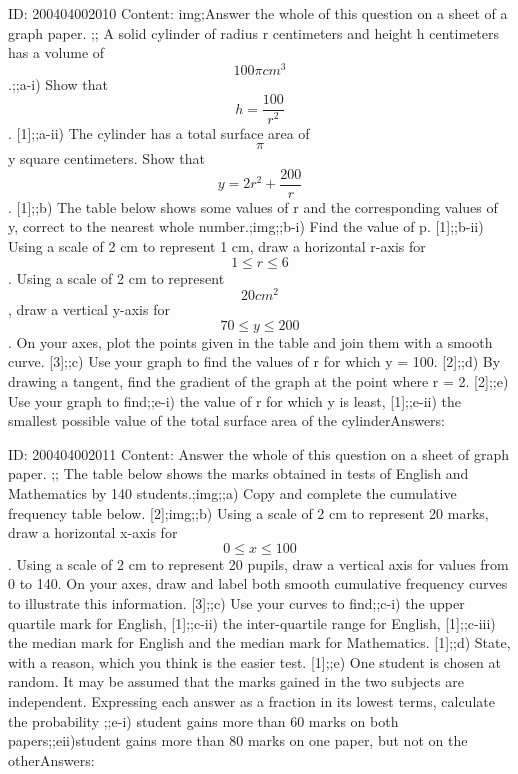 \documentclass{article}
\begin{document}
ID: 200404002010
Content:
img;Answer the whole of this question on a sheet of a graph paper. ;; A solid cylinder of radius r centimeters and height h centimeters has a volume of $$100\pi cm^{3} $$.;;a-i) Show that $$h=\frac{100}{r^{2}}$$. [1];;a-ii) The cylinder has a total surface area of $$\pi$$y square centimeters. Show that $$y=2r^{2} +\frac{200}{r}$$. [1];;b) The table below shows some values of r and the corresponding values of y, correct to the nearest whole number.;img;;b-i) Find the value of p. [1];;b-ii) Using a scale of 2 cm to represent 1 cm, draw a horizontal r-axis for $$1\leq r\leq 6$$. Using a scale of 2 cm to represent $$20 cm^{2} $$, draw a vertical y-axis for $$70\leq y\leq 200$$. On your axes, plot the points given in the table and join them with a smooth curve. [3];;c) Use your graph to find the values of r for which y = 100. [2];;d) By drawing a tangent, find the gradient of the graph at the point where r = 2. [2];;e) Use your graph to find;;e-i) the value of r for which y is least, [1];;e-ii) the smallest possible value of the total surface area of the cylinderAnswers:

ID: 200404002011
Content:
Answer the whole of this question on a sheet of graph paper. ;; The table below shows the marks obtained in tests of English and Mathematics by 140 students.;img;;a) Copy and complete the cumulative frequency table below. [2];img;;b) Using a scale of 2 cm to represent 20 marks, draw a horizontal x-axis for $$0\leq x\leq 100$$. Using a scale of 2 cm to represent 20 pupils, draw a vertical axis for values from 0 to 140. On your axes, draw and label both smooth cumulative frequency curves to illustrate this information. [3];;c) Use your curves to find;;c-i) the upper quartile mark for English, [1];;c-ii) the inter-quartile range for English, [1];;c-iii) the median mark for English and the median mark for Mathematics. [1];;d) State, with a reason, which you think is the easier test. [1];;e) One student is chosen at random. It may be assumed that the marks gained in the two subjects are independent. Expressing each answer as a fraction in its lowest terms, calculate the probability ;;e-i) student gains more than 60 marks on both papers;;eii)student gains more than 80 marks on one paper, but not on the otherAnswers:
\end{document}
